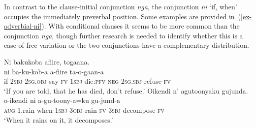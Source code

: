 In contrast to the clause-initial conjunction \emph{nga}, the conjunction \emph{ni} `if, when' occupies the immediately preverbal position. 
Some examples are provided in~(\ref{ex-adverbial-ni}). 
With conditional clauses it seems to be more common than the conjunction \emph{nga}, though further research is needed to identify whether this is a case of free variation or the two conjunctions have a complementary distribution.

\ea \label{ex-adverbial-ni}
\begin{xlist}
\ex \glll   Ni bakukoba afiire, togaana.\\
	        ni ba-ku-kob-a a-fiire  ta-o-gaan-a\\
	    	if \textsc{2sbj}-\textsc{2sg.obj}-say-\textsc{fv} \textsc{1sbj}-die:\textsc{pfv} \textsc{neg}-\textsc{2sg.sbj}-refuse-\textsc{fv}\\
	\glt ‘If you are told, that he has died, don't refuse.'
\ex
	\glll   Oikendi n'	 agutoonyaku gujunda.\\
		o-ikendi ni	a-gu-toony-a=ku gu-jund-a\\ 
	    	\textsc{aug}-1.rain	when \textsc{1sbj}-\textsc{3obj}-rain-\textsc{fv}	\textsc{3sbj}-decompose-\textsc{fv}\\
    \glt `When it rains on it, it decomposes.'
\end{xlist}
\z

